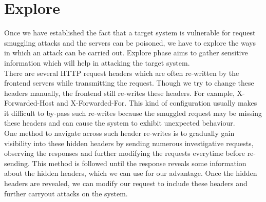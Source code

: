 \section{Explore}
Once we have established the fact that a target system is vulnerable for request smuggling attacks and the servers can be poisoned, we have to explore the ways in which an attack can be carried out. Explore phase aims to gather sensitive information which will help in attacking the target system. \\
There are several HTTP request headers which are often re-written by the frontend servers while transmitting the request. Though we try to change these headers manually, the frontend still re-writes these headers. For example, X-Forwarded-Host and X-Forwarded-For. This kind of configuration usually makes it difficult to by-pass such re-writes because the smuggled request may be missing these headers and can cause the system to exhibit unexpected behaviour. \\
One method to navigate across such header re-writes is to gradually gain visibility into these hidden headers by sending numerous investigative requests, observing the responses and further modifying the requests everytime before re-sending. This method is followed until the response reveals some information about the hidden headers, which we can use for our advantage. Once the hidden headers are revealed, we can modify our request to include these headers and further carryout attacks on the system. 
